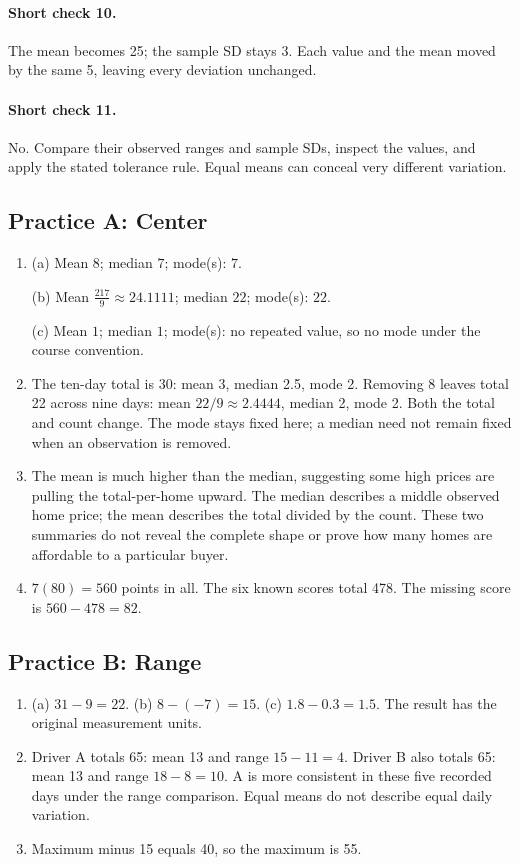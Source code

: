 \paragraph{Short check 10.}
The mean becomes 25; the sample SD stays 3. Each value and the mean moved by the same 5, leaving every deviation unchanged.


\paragraph{Short check 11.}
No. Compare their observed ranges and sample SDs, inspect the values, and apply the stated tolerance rule. Equal means can conceal very different variation.


\clearpage

\subsection*{Practice A: Center}
\begin{enumerate}[label=A\arabic*.,leftmargin=2.5em,itemsep=10pt]
\item (a) Mean $8$; median $7$; mode(s): $7$.

(b) Mean $\frac{217}{9}\approx 24.1111$; median $22$; mode(s): $22$.

(c) Mean $1$; median $1$; mode(s): no repeated value, so no mode under the course convention.
\item The ten-day total is 30: mean 3, median 2.5, mode 2. Removing 8 leaves total 22 across nine days: mean $22/9\approx2.4444$, median 2, mode 2. Both the total and count change. The mode stays fixed here; a median need not remain fixed when an observation is removed.
\item The mean is much higher than the median, suggesting some high prices are pulling the total-per-home upward. The median describes a middle observed home price; the mean describes the total divided by the count. These two summaries do not reveal the complete shape or prove how many homes are affordable to a particular buyer.
\item $7(80)=560$ points in all. The six known scores total 478. The missing score is $560-478=82$.
\end{enumerate}

\subsection*{Practice B: Range}
\begin{enumerate}[label=B\arabic*.,leftmargin=2.5em,itemsep=10pt]
\item (a) $31-9=22$. (b) $8-(-7)=15$. (c) $1.8-0.3=1.5$. The result has the original measurement units.
\item Driver A totals 65: mean 13 and range $15-11=4$. Driver B also totals 65: mean 13 and range $18-8=10$. A is more consistent in these five recorded days under the range comparison. Equal means do not describe equal daily variation.
\item Maximum minus 15 equals 40, so the maximum is 55.
\end{enumerate}

